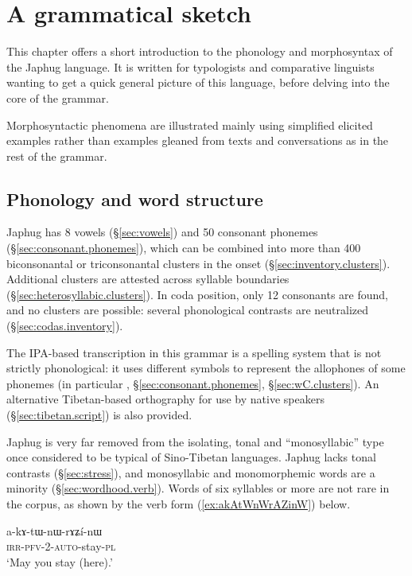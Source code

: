 \chapter{A grammatical sketch} \label{chap:sketch}

This chapter offers a short introduction to the phonology and morphosyntax of the Japhug language. It is written for typologists and comparative linguists wanting to get a quick general picture of this language, before delving into the core of the grammar.

Morphosyntactic phenomena are illustrated mainly using simplified elicited examples rather than examples gleaned from texts and conversations as in the rest of the grammar.

\section{Phonology and word structure} \label{sec:phono.introduction}
 
Japhug has 8 vowels (§\ref{sec:vowels}) and 50 consonant phonemes (§\ref{sec:consonant.phonemes}), which can be combined into more than 400 biconsonantal or triconsonantal clusters in the onset (§\ref{sec:inventory.clusters}). Additional clusters are attested across syllable boundaries (§\ref{sec:heterosyllabic.clusters}). In coda position, only 12 consonants are found, and no clusters are possible: several phonological contrasts are neutralized (§\ref{sec:codas.inventory}).

The IPA-based transcription in this grammar is a spelling system that is not strictly phonological: it uses different symbols to represent the allophones of some phonemes (in particular , §\ref{sec:consonant.phonemes}, §\ref{sec:wC.clusters}). An alternative Tibetan-based orthography for use by native speakers (§\ref{sec:tibetan.script}) is also provided.

Japhug is very far removed from the isolating, tonal and ``monosyllabic'' type once considered to be typical of Sino-Tibetan languages. Japhug lacks tonal contrasts (§\ref{sec:stress}), and monosyllabic and monomorphemic words are a minority (§\ref{sec:wordhood.verb}). Words of six syllables or more are not rare in the corpus, as shown by the verb form (\ref{ex:akAtWnWrAZinW}) below.

\begin{exe}
\ex \label{ex:akAtWnWrAZinW}
\gll a-kɤ-tɯ-nɯ-rɤʑí-nɯ \\
\textsc{irr}-\textsc{pfv}-2-\textsc{auto}-stay-\textsc{pl} \\
\glt `May you stay (here).'
\end{exe}

